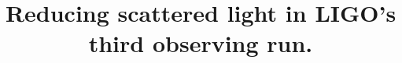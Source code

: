 \documentclass[12pt]{iopart}
\begin{document}






\title{Reducing scattered light in LIGO's third observing run.}





\end{document}
